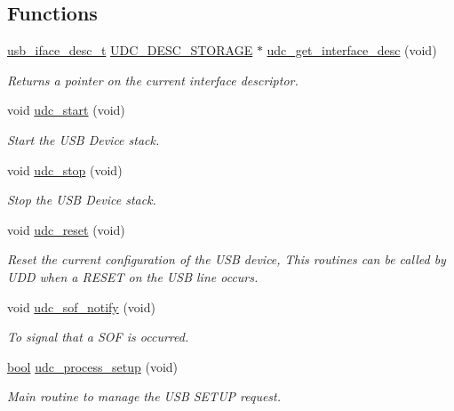 \subsection*{Functions}
\begin{DoxyCompactItemize}
\item 
\hyperlink{structusb__iface__desc__t}{usb\-\_\-iface\-\_\-desc\-\_\-t} \hyperlink{group__udc__desc__group_gae086959cec07a2e71ab069e25a51764f}{U\-D\-C\-\_\-\-D\-E\-S\-C\-\_\-\-S\-T\-O\-R\-A\-G\-E} $\ast$ \hyperlink{group__udc__group__interne_gadb2a0f5ad1e834d4d7e7777f901d64d2}{udc\-\_\-get\-\_\-interface\-\_\-desc} (void)
\begin{DoxyCompactList}\small\item\em Returns a pointer on the current interface descriptor. \end{DoxyCompactList}\item 
\hypertarget{group__udc__group__interne_gadf4e193509cd03ab6333d62629ea51e7}{void \hyperlink{group__udc__group__interne_gadf4e193509cd03ab6333d62629ea51e7}{udc\-\_\-start} (void)}\label{group__udc__group__interne_gadf4e193509cd03ab6333d62629ea51e7}

\begin{DoxyCompactList}\small\item\em Start the U\-S\-B Device stack. \end{DoxyCompactList}\item 
\hypertarget{group__udc__group__interne_gae2264dd91b24db9d4bb23fb1a2014972}{void \hyperlink{group__udc__group__interne_gae2264dd91b24db9d4bb23fb1a2014972}{udc\-\_\-stop} (void)}\label{group__udc__group__interne_gae2264dd91b24db9d4bb23fb1a2014972}

\begin{DoxyCompactList}\small\item\em Stop the U\-S\-B Device stack. \end{DoxyCompactList}\item 
void \hyperlink{group__udc__group__interne_ga11a32ff7928ba06d3b59e95e0a2b7a92}{udc\-\_\-reset} (void)
\begin{DoxyCompactList}\small\item\em Reset the current configuration of the U\-S\-B device, This routines can be called by U\-D\-D when a R\-E\-S\-E\-T on the U\-S\-B line occurs. \end{DoxyCompactList}\item 
void \hyperlink{group__udc__group__interne_ga4afae313045f44b5eb4c60957ab8ef4e}{udc\-\_\-sof\-\_\-notify} (void)
\begin{DoxyCompactList}\small\item\em To signal that a S\-O\-F is occurred. \end{DoxyCompactList}\item 
\hyperlink{group__group__xmega__utils_ga97a80ca1602ebf2303258971a2c938e2}{bool} \hyperlink{group__udc__group__interne_ga58c2916d7984e0e5b2143cadf4af6080}{udc\-\_\-process\-\_\-setup} (void)
\begin{DoxyCompactList}\small\item\em Main routine to manage the U\-S\-B S\-E\-T\-U\-P request. \end{DoxyCompactList}\end{DoxyCompactItemize}
